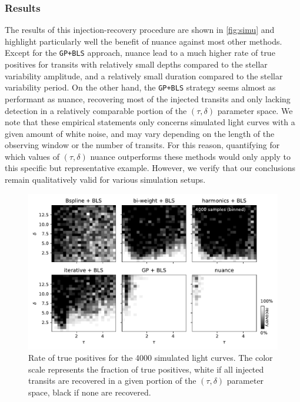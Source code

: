 \documentclass[modern]{aastex631}
\newcommand{\nuancecode}{\textsf{nuance}}
\begin{document}
\subsubsection*{Results}
The results of this injection-recovery procedure are shown in \autoref{fig:simu} and highlight particularly well the benefit of \textsf{nuance} against most other methods. Except for the \texttt{GP+BLS} approach, \nuancecode{} lead to a much higher rate of true positives for transits with relatively small depths compared to the stellar variability amplitude, and a relatively small duration compared to the stellar variability period. On the other hand, the \texttt{GP+BLS} strategy seems almost as performant as \nuancecode, recovering most of the injected transits and only lacking detection in a relatively comparable portion of the $(\tau, \delta)$ parameter space. We note that these empirical statements only concerns simulated light curves with a given amount of white noise, and may vary depending on the length of the observing window or the number of transits. For this reason, quantifying for which values of $(\tau, \delta)$ \textsf{nuance} outperforms these methods would only apply to this specific but representative example. However, we verify that our conclusions remain qualitatively valid for various simulation setups.
\begin{figure}[H]
    \begin{centering}
        \includegraphics[width=\linewidth]{../workflows/synthetic-injection-recovery/figures/synthetic_ir.pdf}
        \caption{Rate of true positives for the 4000 simulated light curves. The color scale represents the fraction of true positives, white if all injected transits are recovered in a given portion of the $(\tau, \delta)$ parameter space, black if none are recovered.}
        \label{fig:simu}
    \end{centering}
\end{figure}
\end{document}
